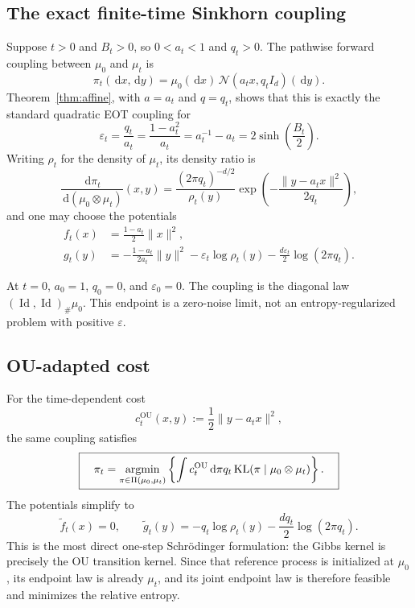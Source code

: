 \documentclass[11pt]{article}
\theoremstyle{remark}
\newcommand{\N}{\mathcal{N}}
\newcommand{\KL}{\operatorname{KL}}
\newcommand{\Id}{\operatorname{Id}}
\newcommand{\PiC}{\Pi}
\newcommand{\dd}{\,\mathrm{d}}
\newcommand{\push}{_{\#}}
\begin{document}
\subsection{The exact finite-time Sinkhorn coupling}

Suppose $t>0$ and $B_t>0$, so $0<a_t<1$ and $q_t>0$.  The pathwise forward
coupling between $\mu_0$ and $\mu_t$ is
\begin{equation}
  \label{eq:vp-coupling}
  \boxed{\quad
  \pi_t(\dd x,\dd y)
  =\mu_0(\dd x)\,\N(a_tx,q_tI_d)(\dd y).
  \quad}
\end{equation}
Theorem~\ref{thm:affine}, with $a=a_t$ and $q=q_t$, shows that this is exactly
the standard quadratic EOT coupling for
\begin{equation}
  \label{eq:epsilon-t}
  \boxed{\quad
  \varepsilon_t=\frac{q_t}{a_t}
  =\frac{1-a_t^2}{a_t}
  =a_t^{-1}-a_t
  =2\sinh\!\left(\frac{B_t}{2}\right).
  \quad}
\end{equation}
Writing $\rho_t$ for the density of $\mu_t$, its density ratio is
\begin{equation}
  \label{eq:vp-rn}
  \frac{\dd\pi_t}{\dd(\mu_0\otimes\mu_t)}(x,y)
  =\frac{(2\pi q_t)^{-d/2}}{\rho_t(y)}
    \exp\!\left(-\frac{\lVert y-a_tx\rVert^2}{2q_t}\right),
\end{equation}
and one may choose the potentials
\begin{align}
  \label{eq:vp-f}
  f_t(x)&=\frac{1-a_t}{2}\lVert x\rVert^2,\\
  \label{eq:vp-g}
  g_t(y)&=-\frac{1-a_t}{2a_t}\lVert y\rVert^2
          -\varepsilon_t\log\rho_t(y)
          -\frac{d\varepsilon_t}{2}\log(2\pi q_t).
\end{align}

At $t=0$, $a_0=1$, $q_0=0$, and $\varepsilon_0=0$.  The coupling is the
diagonal law $(\Id,\Id)\push\mu_0$.  This endpoint is a zero-noise limit, not
an entropy-regularized problem with positive $\varepsilon$.

\subsection{OU-adapted cost}

For the time-dependent cost
\begin{equation}
  \label{eq:ou-cost}
  c_t^{\mathrm{OU}}(x,y)
  :=\frac12\lVert y-a_tx\rVert^2,
\end{equation}
the same coupling satisfies
\begin{equation}
  \label{eq:ou-eot}
  \boxed{\quad
  \pi_t=\mathop{\rm argmin}_{\pi\in\PiC(\mu_0,\mu_t)}
  \left\{
    \int c_t^{\mathrm{OU}}\dd\pi
    q_t\KL(\pi\mid\mu_0\otimes\mu_t)
  \right\}.
  \quad}
\end{equation}
The potentials simplify to
\begin{equation}
  \widetilde f_t(x)=0,
  \qquad
  \widetilde g_t(y)
  =-q_t\log\rho_t(y)-\frac{dq_t}{2}\log(2\pi q_t).
\end{equation}
This is the most direct one-step Schr\"odinger formulation: the Gibbs kernel
is precisely the OU transition kernel.  Since that reference process is
initialized at $\mu_0$, its endpoint law is already $\mu_t$, and its joint
endpoint law is therefore feasible and minimizes the relative entropy.
\end{document}
